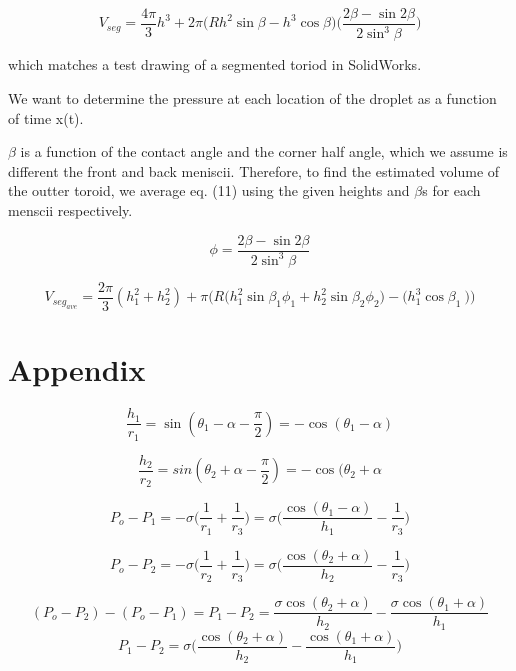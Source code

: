\documentclass{article}
\begin{document}
\begin{equation}
V_{seg} = \frac{4\pi}{3} h^3 + 2\pi \Big(Rh^2\sin\beta - h^3\cos\beta\Big)  \Big( \frac{2\beta - \sin2 \beta}{2\sin^3\beta} \Big)
\end{equation}

which matches a test drawing of a segmented toriod in SolidWorks.

We want to determine the pressure at each location of the droplet as a function of time x(t). 



$\beta$ is a function of the contact angle and the corner half angle, which we assume is different the front and back meniscii. Therefore, to find the estimated volume of the outter toroid, we average eq. (11) using the given heights and $\beta$s for each menscii respectively.

$$\phi= \frac{2\beta - \sin2 \beta}{2\sin^3\beta}$$

\begin{equation}
V_{seg_{ave}} = \frac{2\pi}{3}(h_1^2 + h_2^2) + \pi\Big(R\big(h_1^2\sin\beta_1 \phi_1+h_2^2\sin\beta_2 \phi_2\big) - \big(h_1^3\cos\beta_1\ \big)\Big)
\end{equation} 

\pagebreak

\section*{Appendix}
 

\begin{equation}
\frac{h_1}{r_1} = \sin(\theta_1 - \alpha - \frac{\pi}{2}) = - \cos(\theta_1 - \alpha)
\end{equation}

\begin{equation}
\frac{h_2}{r_2} = sin(\theta_2 + \alpha - \frac{\pi}{2}) = -\cos(\theta_2 + \alpha
\end{equation}

\begin{equation}
P_o - P_1 = -\sigma \Big( \frac{1}{r_1} + \frac{1}{r_3} \Big) = \sigma \Big( \frac{\cos(\theta_1 - \alpha)}{h_1} - \frac{1}{r_3} \Big)
\end{equation} 

\begin{equation}
P_o - P_2 = -\sigma \Big( \frac{1}{r_2} + \frac{1}{r_3} \Big) = \sigma \Big( \frac{\cos(\theta_2 + \alpha)}{h_2} - \frac{1}{r_3} \Big)
\end{equation}

\begin{equation}
(P_o - P_2) - (P_o - P_1) = P_1 - P_2 = \frac{\sigma \cos(\theta_2 + \alpha)}{h_2} - \frac{\sigma \cos(\theta_1 + \alpha)}{h_1}
\end{equation}
\begin{equation}
P_1 - P_2 = \sigma \Big(  \frac{\cos(\theta_2 + \alpha)}{h_2} -\frac{\cos(\theta_1 + \alpha)}{h_1} \Big)
\end{equation}

\pagebreak

 

\end{document}
